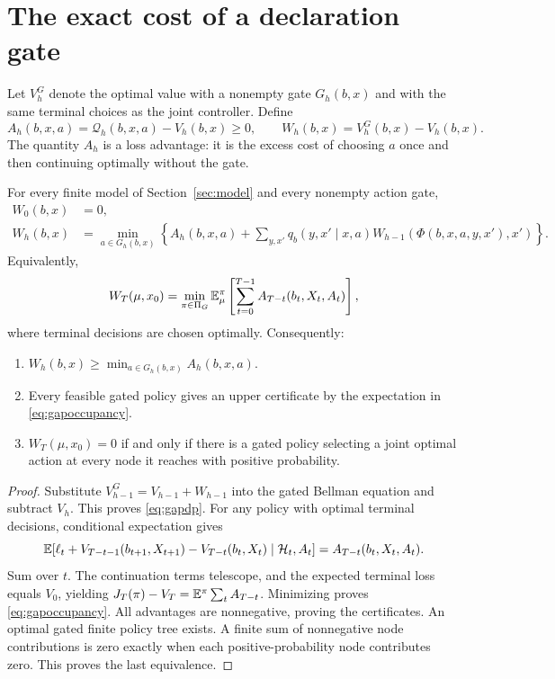 \section{The exact cost of a declaration gate}
\label{sec:gate}
Let $V_h^G$ denote the optimal value with a nonempty gate $G_h(b,x)$ and with the
same terminal choices as the joint controller. Define
\begin{equation}
A_h(b,x,a)=\mathcal Q_h(b,x,a)-V_h(b,x)\ge0,
\qquad W_h(b,x)=V_h^G(b,x)-V_h(b,x).
\end{equation}
The quantity $A_h$ is a loss advantage: it is the excess cost of choosing $a$
once and then continuing optimally without the gate.

\begin{theorem}
\label{thm:gate}
For every finite model of Section~\ref{sec:model} and every nonempty action gate,
\begin{align}
W_0(b,x)&=0,\\
W_h(b,x)&=\min_{a\in G_h(b,x)}
 \left\{A_h(b,x,a)+
  \sum_{y,x'}q_b(y,x'\mid x,a)W_{h-1}(\Phi(b,x,a,y,x'),x')\right\}.
\label{eq:gapdp}
\end{align}
Equivalently,
\begin{equation}
W_T(\mu,x_0)=
\min_{\pi\in\Pi_G}\mathbb E_\mu^\pi
\left[\sum_{t=0}^{T-1}A_{T-t}(b_t,X_t,A_t)\right],
\label{eq:gapoccupancy}
\end{equation}
where terminal decisions are chosen optimally. Consequently:
\begin{enumerate}
\item $W_h(b,x)\ge\min_{a\in G_h(b,x)}A_h(b,x,a)$.
\item Every feasible gated policy gives an upper certificate by the expectation
in \eqref{eq:gapoccupancy}.
\item $W_T(\mu,x_0)=0$ if and only if there is a gated policy selecting a joint
optimal action at every node it reaches with positive probability.
\end{enumerate}
\end{theorem}
\begin{proof}
Substitute $V_{h-1}^G=V_{h-1}+W_{h-1}$ into the gated Bellman equation and
subtract $V_h$. This proves \eqref{eq:gapdp}. For any policy with optimal terminal
decisions, conditional expectation gives
\[
\mathbb E[\ell_t+V_{T-t-1}(b_{t+1},X_{t+1})-V_{T-t}(b_t,X_t)\mid\mathcal H_t,A_t]
=A_{T-t}(b_t,X_t,A_t).
\]
Sum over $t$. The continuation terms telescope, and the expected terminal loss
equals $V_0$, yielding $J_T(\pi)-V_T=\mathbb E^\pi\sum_t A_{T-t}$.
Minimizing proves \eqref{eq:gapoccupancy}. All advantages are nonnegative, proving
the certificates. An optimal gated finite policy tree exists. A finite sum of
nonnegative node contributions is zero exactly when each positive-probability
node contributes zero. This proves the last equivalence.
\end{proof}

